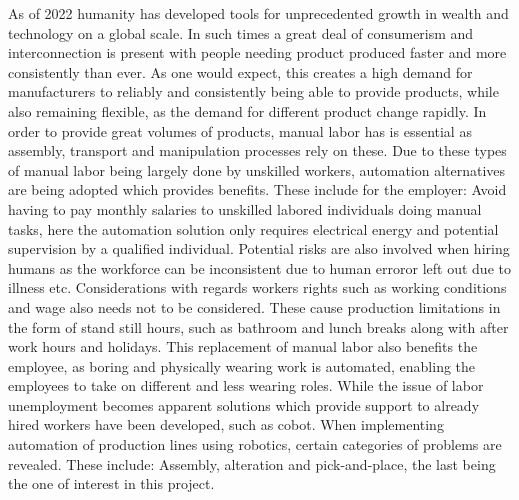 As of 2022 humanity has developed tools for unprecedented growth in wealth and technology on a global scale. In such times a great deal of consumerism and interconnection is present with people needing product produced faster and more consistently than ever. 
As one would expect, this creates a high demand for manufacturers to reliably and consistently being able to provide products, while also remaining flexible, as the demand for different product change rapidly. 
In order to provide great volumes of products, manual labor has is essential as assembly, transport and manipulation processes rely on these. Due to these types of manual labor being largely done by unskilled workers, automation alternatives are being adopted which provides benefits. 
These include for the employer: Avoid having to pay monthly salaries to unskilled labored individuals doing manual tasks, here the automation solution only requires electrical energy and potential supervision by a qualified individual. Potential risks are also involved when hiring humans as the workforce can be inconsistent due to human error\fakecite or left out due to illness etc. Considerations with regards workers rights such as working conditions and wage also needs not to be considered. These cause production limitations in the form of stand still hours, such as bathroom and lunch breaks along with after work hours and holidays. 
This replacement of manual labor also benefits the employee, as boring and physically wearing work is automated, enabling the employees to take on different and less wearing roles. While the issue of labor unemployment becomes apparent solutions which provide support to already hired workers have been developed, such as \gls{cobot}\fakecite. \medskip
When implementing automation of production lines using robotics, certain categories of problems are revealed. These include: Assembly, alteration and pick-and-place, the last being the one of interest in this project. 
